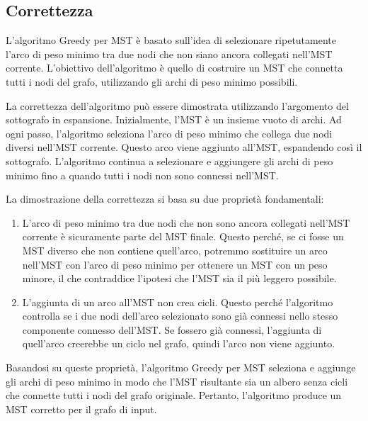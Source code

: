 \subsection{Correttezza}
L'algoritmo Greedy per MST è basato sull'idea di selezionare ripetutamente l'arco di peso minimo tra due nodi che non siano ancora collegati nell'MST corrente. L'obiettivo dell'algoritmo è quello di costruire un MST che connetta tutti i nodi del grafo, utilizzando gli archi di peso minimo possibili.

La correttezza dell'algoritmo può essere dimostrata utilizzando l'argomento del sottografo in espansione. Inizialmente, l'MST è un insieme vuoto di archi. Ad ogni passo, l'algoritmo seleziona l'arco di peso minimo che collega due nodi diversi nell'MST corrente. Questo arco viene aggiunto all'MST, espandendo così il sottografo. L'algoritmo continua a selezionare e aggiungere gli archi di peso minimo fino a quando tutti i nodi non sono connessi nell'MST.

La dimostrazione della correttezza si basa su due proprietà fondamentali:

\begin{enumerate}
\item L'arco di peso minimo tra due nodi che non sono ancora collegati nell'MST corrente è sicuramente parte del MST finale. Questo perché, se ci fosse un MST diverso che non contiene quell'arco, potremmo sostituire un arco nell'MST con l'arco di peso minimo per ottenere un MST con un peso minore, il che contraddice l'ipotesi che l'MST sia il più leggero possibile.
\item L'aggiunta di un arco all'MST non crea cicli. Questo perché l'algoritmo controlla se i due nodi dell'arco selezionato sono già connessi nello stesso componente connesso dell'MST. Se fossero già connessi, l'aggiunta di quell'arco creerebbe un ciclo nel grafo, quindi l'arco non viene aggiunto.
\end{enumerate}

Basandosi su queste proprietà, l'algoritmo Greedy per MST seleziona e aggiunge gli archi di peso minimo in modo che l'MST risultante sia un albero senza cicli che connette tutti i nodi del grafo originale. Pertanto, l'algoritmo produce un MST corretto per il grafo di input.



